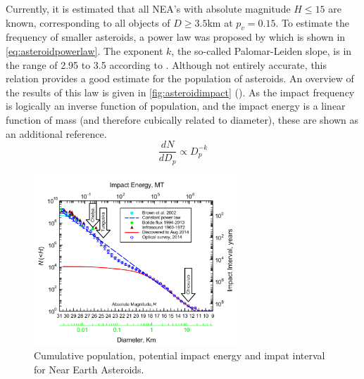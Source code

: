 Currently, it is estimated that all NEA's with absolute magnitude $H \leq 15$ are known, corresponding to all objects of $D \geq 3.5$km at $p_v = 0.15$. To estimate the frequency of smaller asteroids, a power law was proposed by \cite{asteroidpowerlaw} which is shown in \autoref{eq:asteroidpowerlaw}. The exponent $k$, the so-called Palomar-Leiden slope, is in the range of 2.95 to 3.5 according to \cite{impactrate}. Although not entirely accurate, this relation provides a good estimate for the population of asteroids. An overview of the results of this law is given in \autoref{fig:asteroidimpact} (\cite{populationofnea}). As the impact frequency is logically an inverse function of population, and the impact energy is a linear function of mass (and therefore cubically related to diameter), these are shown as an additional reference. \\

\begin{equation}
    \frac{dN}{dD_p} \propto D_p^{-k}
    \label{eq:asteroidpowerlaw}
\end{equation}

\begin{figure}[htbp]
    \centering
    \includegraphics[width=0.68\textwidth]{images/asteroidexpectedimpact.png}
    \caption{Cumulative population, potential impact energy and impat interval for Near Earth Asteroids.}
    \label{fig:asteroidimpact}
\end{figure}

